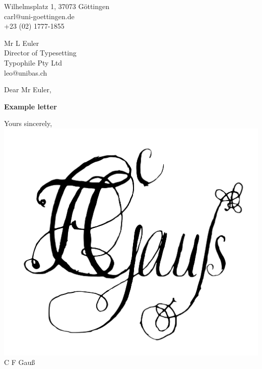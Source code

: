 \documentclass{coverletter}
\def\signature{\\[-12pt]
    \hspace*{-3.5em}
    \includegraphics[scale=0.2]{signature.pdf}\\[-12pt]}
\begin{document}
\begin{flushright}
\home Wilhelmsplatz 1, 37073 G\"{o}ttingen \\[6pt]
\email carl@uni-goettingen.de \\[6pt]
\phone +23 (02) 1777-1855 \\[6pt]
\end{flushright}

Mr L Euler \\
Director of Typesetting \\
Typophile Pty Ltd \\
\email leo@unibas.ch \\

\todaysdate

Dear Mr Euler,

\textbf{Example letter}

\lipsum[2-3]

Yours sincerely,
\signature
C F Gau\ss
\end{document}
